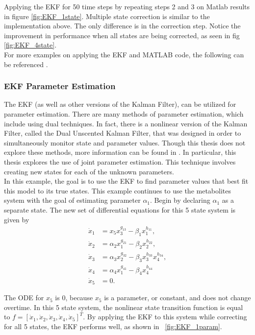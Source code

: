 \noindent Applying the EKF for 50 time steps by repeating steps 2 and 3 on Matlab results in figure \ref{fig:EKF_1state}. Multiple state correction is similar to the implementation above. The only difference is in the correction step. Notice the improvement in performance when all states are being corrected, as seen in fig \ref{fig:EKF_4state}.  \\

\noindent For more examples on applying the EKF and MATLAB code, the following can be referenced \cite{cao_2008, article7}.






\clearpage
\subsubsection{EKF Parameter Estimation}
The EKF (as well as other versions of the Kalman Filter), can be utilized for parameter estimation. There are many methods of parameter estimation, which include using dual techniques. In fact, there is a nonlinear version of the Kalman Filter, called the Dual Unscented Kalman Filter, that was designed in order to simultaneously monitor state and parameter values. Though this thesis does not explore these methods, more information can be found in \cite{inbook, article6}. In particular, this thesis explores the use of joint parameter estimation. This technique involves creating new states for each of the unknown parameters. \\ 

\noindent In this example, the goal is to use the EKF to find parameter values that best fit this model to its true states. This example continues to use the metabolites system with the goal of estimating parameter $\alpha_1$. Begin by declaring $\alpha_1$ as a separate state. The new set of differential equations for this 5 state system is given by
\begin{align*}
\dot x_1 &= x_5 x_3^{g_{13}} - \beta_1 x_1^{h_{11}}, \\
\dot x_2 &= \alpha_2 x_1^{g_{21}} - \beta_2 x_2^{h_{22}}, \\
\dot x_3 &= \alpha_3 x_2^{g_{32}} - \beta_3 x_3^{h_{33}} x_4^{h_{34}}, \\
\dot x_4 &= \alpha_4  x_1^{g_{41}} - \beta_4 x_4^{h_{44}}\\
\dot x_5 &= 0.
\end{align*}


\noindent The ODE for $x_5$ is 0, because $x_5$ is a parameter, or constant, and does not change overtime. In this 5 state system, the nonlinear state transition function is equal to $f = [\dot x_1, \dot x_2, \dot x_3, \dot x_4, \dot x_5]^T$. By applying the EKF to this system while correcting for all 5 states, the EKF performs well, as shown in ~\ref{fig:EKF_1param}.

